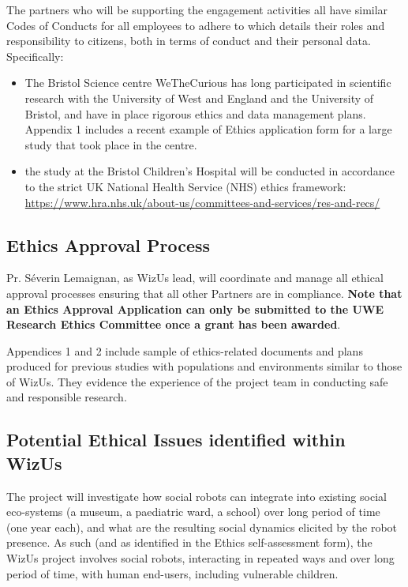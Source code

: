 \documentclass[11pt,a4paper]{report}
\newcommand{\project}{WizUs\xspace}
\begin{document}
The partners who will be supporting the engagement activities all have similar
Codes of Conducts for all employees to adhere to which details their roles and
responsibility to citizens, both in terms of conduct and their personal data.
Specifically:

\begin{itemize}
    \item The Bristol Science centre WeTheCurious has long participated in
        scientific research with the University of West and England and the
        University of Bristol, and have in place rigorous ethics and data
        management plans. Appendix 1 includes a recent example of Ethics
        application form for a large study that took place in the centre.
    \item the study at the Bristol Children's Hospital will be conducted in
        accordance to the strict UK National Health Service (NHS) ethics
        framework:
        \url{https://www.hra.nhs.uk/about-us/committees-and-services/res-and-recs/}
\end{itemize}



\subsection{Ethics Approval Process}

Pr. Séverin Lemaignan, as \project lead, will coordinate and manage all ethical
approval processes ensuring that all other Partners are in compliance. \textbf{Note that
an Ethics Approval Application can only be submitted to the UWE Research Ethics
Committee once a grant has been awarded}.

Appendices 1 and 2 include sample of ethics-related documents and plans produced
for previous studies with populations and environments similar to those of
\project. They evidence the experience of the project team in conducting safe
and responsible research.

\subsection{Potential Ethical Issues identified within \project}

The project will investigate how social robots can integrate into existing
social eco-systems (a museum, a paediatric ward, a school) over long period of
time (one year each), and what are the resulting social dynamics elicited by the
robot presence. As such (and as identified in the Ethics self-assessment form),
the \project project involves social robots, interacting in repeated ways and
over long period of time, with human end-users, including vulnerable children.
\end{document}
